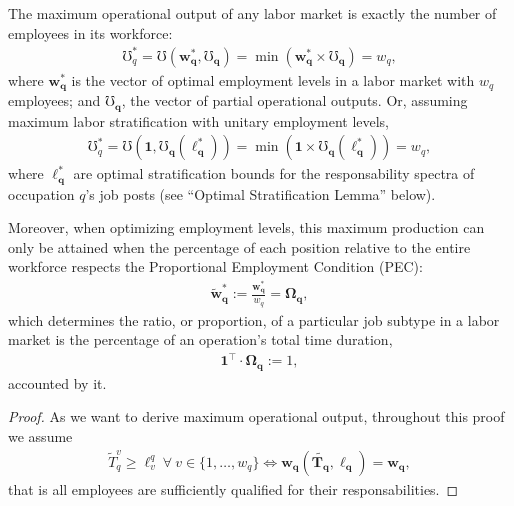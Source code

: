 \documentclass[hidelinks, nonatbib]{elsarticle}
\begin{document}
\begin{lemma}
    The maximum operational output of any labor market is exactly the number of employees in its workforce:
    \begin{gather}
        \mho_{q}^{*}
        =
        \mho(
            \boldsymbol{w_{q}^{*}},
            \boldsymbol{\mho_q}
        )
        = 
        \min(
            \boldsymbol{w_{q}^{*}}
            \times
            \boldsymbol{\mho_q}
        )
        = w_q
        ,
    \end{gather}
    where $\boldsymbol{w_{q}^{*}}$ is the vector of optimal employment levels in a labor market with $w_q$ employees; and $\boldsymbol{\mho_q}$, the vector of partial operational outputs. Or, assuming maximum labor stratification with unitary employment levels,
    \begin{gather}
        \mho_{q}^{*}
        =
        \mho(
            \boldsymbol{1},
            \boldsymbol{\mho_q}(
                \boldsymbol{\ell_{q}^{*}}
            )
        )
        =
        \min(
            \boldsymbol{1}
            \times
            \boldsymbol{\mho_q}(
                \boldsymbol{\ell_{q}^{*}}
            )
        )
        = w_q
        ,
    \end{gather}
    where $\boldsymbol{\ell_{q}^{*}}$ are optimal stratification bounds for the responsability spectra of occupation $q$'s job posts (see ``Optimal Stratification Lemma'' below).
    
    Moreover, when optimizing employment levels, this maximum production can only be attained when the percentage of each position relative to the entire workforce respects the Proportional Employment Condition (PEC):
    \begin{gather}
        \boldsymbol{\tilde{w}_{q}^{*}}
        :=
        \frac{
            \boldsymbol{w_{q}^{*}}
        }{
            w_q
        }
        =
        \boldsymbol{\Omega_{q}}
        ,
    \end{gather}
    which determines the ratio, or proportion, of a particular job subtype in a labor market is the percentage of an operation's total time duration,
    \begin{gather}
        \boldsymbol{1} ^ {\top}
        \cdot
        \boldsymbol{\Omega_{q}}
        := 1
        ,
    \end{gather}
    accounted by it.
    
    \begin{proof}
        As we want to derive maximum operational output, throughout this proof we assume
        \begin{gather}
            \tilde{T}_{q}^{v} \geq \ell_{v}^{q}
            \
            \forall
            \
            v \in \{1, \dots, w_q\}
            \iff
            \boldsymbol{w_q}(
                \boldsymbol{\tilde{T_q}},
                \boldsymbol{\ell_q}
            )
            =
            \boldsymbol{w_q}
            ,
        \end{gather}
        that is all employees are sufficiently qualified for their responsabilities.
        

\end{proof}
\end{lemma}
\end{document}
